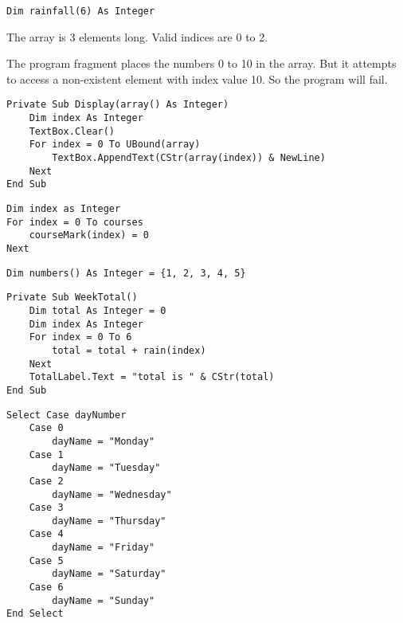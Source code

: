  
			\begin{stab}
				\begin{enumChapter}
				\item
					\begin{lstlisting}
Dim rainfall(6) As Integer
					\end{lstlisting}
				\item	The array is 3 elements long. Valid indices are 0 to 2.
				\item The program fragment places the numbers 0 to 10 in the array. But it attempts to access a non-existent element with index value 10. So the program will fail.
				\item 
					\begin{lstlisting}
Private Sub Display(array() As Integer)
	Dim index As Integer
	TextBox.Clear()
	For index = 0 To UBound(array)
		TextBox.AppendText(CStr(array(index)) & NewLine)
	Next
End Sub
					\end{lstlisting}
				\item
					\begin{lstlisting}
Dim index as Integer
For index = 0 To courses
	courseMark(index) = 0
Next
					\end{lstlisting}
				\item
					\begin{lstlisting}
Dim numbers() As Integer = {1, 2, 3, 4, 5}
					\end{lstlisting}
				\item
					\begin{lstlisting}
Private Sub WeekTotal()
	Dim total As Integer = 0
	Dim index As Integer
	For index = 0 To 6
		total = total + rain(index)
	Next
	TotalLabel.Text = "total is " & CStr(total)
End Sub
					\end{lstlisting}
				\item
					\begin{lstlisting}
Select Case dayNumber
	Case 0
		dayName = "Monday"
	Case 1
		dayName = "Tuesday"
	Case 2
		dayName = "Wednesday"
	Case 3
		dayName = "Thursday"
	Case 4
		dayName = "Friday"
	Case 5
		dayName = "Saturday"
	Case 6
		dayName = "Sunday"
End Select
					\end{lstlisting}
				\end{enumChapter}
			\end{stab}

